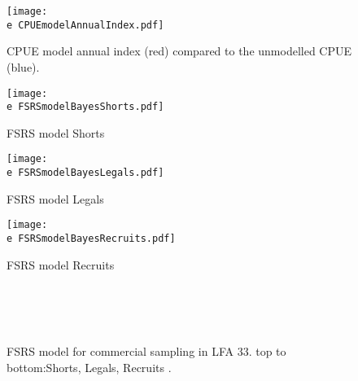 \documentclass[11pt]{article}
\newcommand{\e}{\string~/bio.data/bio.lobster/figures/LFA2733Framework2018/} %
\begin{document}
    \begin{figure}
    \centering
        \texttt{[image: \\e CPUEmodelAnnualIndex.pdf]}
        \caption{CPUE model annual index (red) compared to the unmodelled CPUE (blue).}

    \end{figure}




    \begin{figure}
    \centering
        \texttt{[image: \\e FSRSmodelBayesShorts.pdf]}
        \caption{FSRS model Shorts}

    \end{figure}


    \begin{figure}
    \centering
        \texttt{[image: \\e FSRSmodelBayesLegals.pdf]}
        \caption{FSRS model Legals}

    \end{figure}


    \begin{figure}
    \centering
        \texttt{[image: \\e FSRSmodelBayesRecruits.pdf]}
        \caption{FSRS model Recruits}

    \end{figure}

        \begin{figure}
        \centering
                \\
                \\
                \\
        
         \caption{FSRS model for commercial sampling in LFA 33. top to bottom:Shorts, Legals, Recruits .}
        \end{figure}
\end{document}
